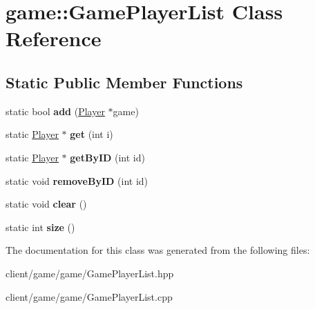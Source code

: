 \hypertarget{classgame_1_1_game_player_list}{\section{game\-:\-:Game\-Player\-List Class Reference}
\label{classgame_1_1_game_player_list}
}
\subsection*{Static Public Member Functions}
\begin{DoxyCompactItemize}
\item 
\hypertarget{classgame_1_1_game_player_list_ad1d1ca4938da68a31b928324d9e10903}{static bool {\bfseries add} (\hyperlink{classgame_1_1_player}{Player} $\ast$game)}\label{classgame_1_1_game_player_list_ad1d1ca4938da68a31b928324d9e10903}

\item 
\hypertarget{classgame_1_1_game_player_list_a0dda4d601ceae4040816c2b7bc10e8cb}{static \hyperlink{classgame_1_1_player}{Player} $\ast$ {\bfseries get} (int i)}\label{classgame_1_1_game_player_list_a0dda4d601ceae4040816c2b7bc10e8cb}

\item 
\hypertarget{classgame_1_1_game_player_list_a7a3987544373726616570abbce324fb7}{static \hyperlink{classgame_1_1_player}{Player} $\ast$ {\bfseries get\-By\-I\-D} (int id)}\label{classgame_1_1_game_player_list_a7a3987544373726616570abbce324fb7}

\item 
\hypertarget{classgame_1_1_game_player_list_aaa71959a48205a203e21de8c92f7c2ef}{static void {\bfseries remove\-By\-I\-D} (int id)}\label{classgame_1_1_game_player_list_aaa71959a48205a203e21de8c92f7c2ef}

\item 
\hypertarget{classgame_1_1_game_player_list_a1bd51793013faa2dc0199c44425107b9}{static void {\bfseries clear} ()}\label{classgame_1_1_game_player_list_a1bd51793013faa2dc0199c44425107b9}

\item 
\hypertarget{classgame_1_1_game_player_list_a675858acade92c82260c7ffac3d99da2}{static int {\bfseries size} ()}\label{classgame_1_1_game_player_list_a675858acade92c82260c7ffac3d99da2}

\end{DoxyCompactItemize}


The documentation for this class was generated from the following files\-:\begin{DoxyCompactItemize}
\item 
client/game/game/Game\-Player\-List.\-hpp\item 
client/game/game/Game\-Player\-List.\-cpp\end{DoxyCompactItemize}
